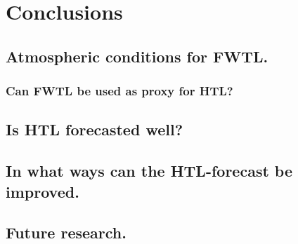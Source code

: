 \chapter{Conclusions}

\section{Atmospheric conditions for FWTL.}

\subsection{Can FWTL be used as proxy for HTL?}

\section{Is HTL forecasted well?}

\section{In what ways can the HTL-forecast be improved.}

\section{Future research.}